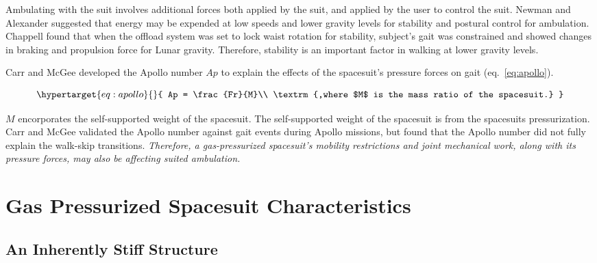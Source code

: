 \documentclass[defaultstyle,11pt]{comps}
\begin{document}
Ambulating with the suit involves additional forces both applied by the suit, and applied by the user to control the suit.
Newman and Alexander \citep{Newman1993} suggested that energy may be expended at low speeds and lower gravity levels for stability and postural control for ambulation.
Chappell \citep{Chappell2006} found that when the offload system was set to lock waist rotation for stability, subject's gait was constrained and showed changes in braking and propulsion force for Lunar gravity.
Therefore, stability is an important factor in walking at lower gravity levels.

Carr and McGee \citep{Carr2009} developed the Apollo number \(Ap\) to explain the effects of the spacesuit's pressure forces on gait (eq.~\ref{eq:apollo}).

\begin{equation}\protect\hypertarget{eq:apollo}{}{
Ap = \frac{Fr}{M}\\
\textrm{,where $M$ is the mass ratio of the spacesuit.}
}\label{eq:apollo}\end{equation}

\(M\) encorporates the self-supported weight of the spacesuit.
The self-supported weight of the spacesuit is from the spacesuits pressurization.
Carr and McGee validated the Apollo number against gait events during Apollo missions, but found that the Apollo number did not fully explain the walk-skip transitions.
\emph{Therefore, a gas-pressurized spacesuit's mobility restrictions and joint mechanical work, along with its pressure forces, may also be affecting suited ambulation.}

\hypertarget{gas-pressurized-spacesuit-characteristics}{%
\section{Gas Pressurized Spacesuit Characteristics}\label{gas-pressurized-spacesuit-characteristics}}

\hypertarget{an-inherently-stiff-structure}{%
\subsection{An Inherently Stiff Structure}\label{an-inherently-stiff-structure}}
\end{document}
